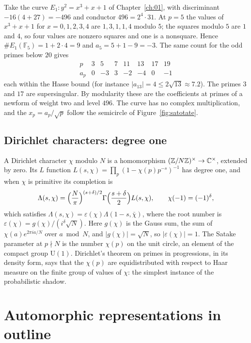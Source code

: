\begin{example}\label{ex:02curve}
Take the curve $E_1:y^2=x^3+x+1$ of Chapter~\ref{ch:01}, with discriminant $-16(4+27)=-496$ and conductor $496=2^4\cdot31$. At $p=5$ the values of $x^3+x+1$ for $x=0,1,2,3,4$ are $1,3,1,1,4$ modulo $5$; the squares modulo $5$ are $1$ and $4$, so four values are nonzero squares and one is a nonsquare. Hence $\#E_1(\mathbb F_5)=1+2\cdot4=9$ and $a_5=5+1-9=-3$. The same count for the odd primes below $20$ gives
\[
\begin{array}{cccccccc}
p&3&5&7&11&13&17&19\\
a_p&0&-3&3&-2&-4&0&-1
\end{array}
\]
each within the Hasse bound (for instance $|a_{13}|=4\le2\sqrt{13}\approx7.2$). The primes $3$ and $17$ are supersingular. By modularity these are the coefficients at primes of a newform of weight two and level $496$. The curve has no complex multiplication, and the $x_p=a_p/\sqrt p$ follow the semicircle of Figure~\ref{fig:satotate}.
\end{example}

\subsection{Dirichlet characters: degree one}
A Dirichlet character $\chi$ modulo $N$ is a homomorphism $(\mathbb{Z}/N\mathbb{Z})^\times\to\mathbb{C}^\times$, extended by zero. Its $L$ function $L(s,\chi)=\prod_{p}(1-\chi(p)p^{-s})^{-1}$ has degree one, and when $\chi$ is primitive its completion is
\[
\Lambda(s,\chi)=\Bigl(\frac N\pi\Bigr)^{(s+\delta)/2}\Gamma\Bigl(\frac{s+\delta}2\Bigr)L(s,\chi),\qquad\chi(-1)=(-1)^\delta,
\]
which satisfies $\Lambda(s,\chi)=\varepsilon(\chi)\Lambda(1-s,\bar\chi)$, where the root number is $\varepsilon(\chi)=g(\chi)/(i^\delta\sqrt N)$. Here $g(\chi)$ is the Gauss sum, the sum of $\chi(a)e^{2\pi ia/N}$ over $a\bmod N$, and $|g(\chi)|=\sqrt N$, so $|\varepsilon(\chi)|=1$. The Satake parameter at $p\nmid N$ is the number $\chi(p)$ on the unit circle, an element of the compact group $\mathrm U(1)$. Dirichlet's theorem on primes in progressions, in its density form, says that the $\chi(p)$ are equidistributed with respect to Haar measure on the finite group of values of $\chi$: the simplest instance of the probabilistic shadow.

\section{Automorphic representations in outline}

